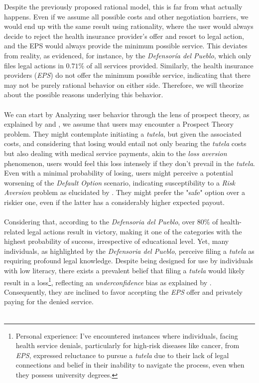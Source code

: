 \documentclass[12pt]{article}
\begin{document}
\begin{flushleft}

    Despite the previously proposed rational model, this is far from what actually happens. Even if we assume all possible costs and other negotiation barriers, we would end up with the same result using rationality, where the user would always decide to reject the health insurance provider's offer and resort to legal action, and the EPS would always provide the minimum possible service. This deviates from reality, as evidenced, for instance, by the \textit{Defensoría del Pueblo}, which only files legal actions in $0.71\%$ of all services provided. Similarly, the health insurance providers (\textit{EPS}) do not offer the minimum possible service, indicating that there may not be purely rational behavior on either side. Therefore, we will theorize about the possible reasons underlying this behavior.\\~\\

    We can start by Analyzing user behavior through the lens of prospect theory, as explained by \citet{thaler1980toward} and \citet{tversky1991loss}, we assume that users may encounter a Prospect Theory problem. They might contemplate initiating a \textit{tutela}, but given the associated costs, and considering that losing would entail not only bearing the \textit{tutela} costs but also dealing with medical service payments, akin to the \textit{loss aversion} phenomenon, users would feel this loss intensely if they don't prevail in the \textit{tutela}. Even with a minimal probability of losing, users might perceive a potential worsening of the \textit{Default Option} scenario, indicating susceptibility to a \textit{Risk Aversion} problem as elucidated by \citet{rabin2000risk}. They might prefer the "safe" option over a riskier one, even if the latter has a considerably higher expected payout.\\~\\

    Considering that, according to the \textit{Defensoria del Pueblo}, over $80\%$ of health-related legal actions result in victory, making it one of the categories with the highest probability of success, irrespective of educational level. Yet, many individuals, as highlighted by the \textit{Defensoria del Pueblo}, perceive filing a \textit{tutela} as requiring profound legal knowledge. Despite being designed for use by individuals with low literacy, there exists a prevalent belief that filing a \textit{tutela} would likely result in a loss\footnote{Personal experience: I've encountered instances where individuals, facing health service denials, particularly for high-risk diseases like cancer, from \textit{EPS}, expressed reluctance to pursue a \textit{tutela} due to their lack of legal connections and belief in their inability to navigate the process, even when they possess university degrees.}, reflecting an \textit{underconfidence} bias as explained by \citet{bjorkman1993realism}. Consequently, they are inclined to favor accepting the \textit{EPS} offer and privately paying for the denied service.\\~\\
    

\end{flushleft}
\end{document}
